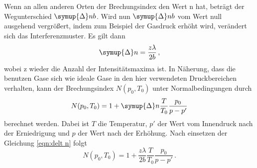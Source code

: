 Wenn an allen anderen Orten der Brechungsindex den Wert n hat, beträgt der Wegunterschied $\symup{\Delta} n b$. Wird nun $\symup{\Delta} n b$  vom Wert null ausgehend vergrößert, indem zum Beispiel der Gasdruck erhöht wird, verändert sich das Interferenzmuster.
Es gilt dann
\begin{equation}
\symup{\Delta} n = \frac{z \lambda}{2 b}\, ,
    \label{eqn:delt n}
\end{equation}
wobei z wieder die Anzahl der Intensitätsmaxima ist. In Näherung, dass die benutzen Gase sich wie ideale Gase in den hier verwendeten Druckbereichen verhalten, kann der Brechungsindex
$N(p_0,T_0)$ unter Normalbedingungen durch
\begin{equation*}
    N(p_0 , T_0)=1+\symup{\Delta} n \frac{T}{T_0} \frac{p_0}{p-p'} 
\end{equation*}
berechnet werden. Dabei ist $T$ die Temperatur, $p'$ der Wert vom Innendruck nach der Erniedrigung und $p$ der Wert nach der Erhöhung.
Nach einsetzen der Gleichung \eqref{eqn:delt n} folgt
\begin{equation}
    N(p_0 , T_0)=1+ \frac{z \lambda}{2 b} \frac{T}{T_0} \frac{p_0}{p-p'}  \, .
    \label{eqn:brechen}
\end{equation}

